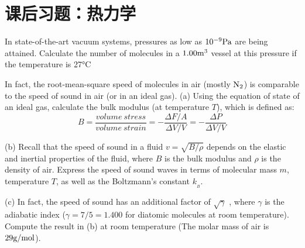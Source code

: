%
    \section{课后习题：热力学}
    \begin{example}
        In state-of-the-art vacuum systems, pressures as low as $10^{-9}\rm{Pa}$ are being attained. 
        Calculate the number of molecules in a $1.00\rm{m^{3}}$ vessel at this pressure if the temperature is 27°C
    \end{example}
    \begin{example}
        In fact, the root-mean-square 
        speed of molecules in air (mostly $\rm{N_2}$) is comparable to 
        the speed of sound in air (or in an ideal gas).
        (a) Using the equation of state of an ideal gas, calculate the bulk 
        modulus (at temperature $T$), which is defined as:
        \begin{equation*}
            B = \frac{volume \ stress}{volume \ strain} = -\frac{\Delta F/A}{\Delta V/V} = -\frac{\Delta P}{\Delta V/V}
        \end{equation*}

        (b) Recall that the speed of sound in a fluid $v=\sqrt{B/\rho}$ depends on
        the elastic and inertial properties of the fluid, where $B$ is the bulk
        modulus and $\rho$ is the density of air. Express the speed of sound 
        waves in terms of molecular mass $m$, temperature $T$, as well as 
        the Boltzmann's constant $k_{_B}$.

        (c) In fact, the speed of sound has an additional factor of $\sqrt{\gamma}$ ,
        where $\gamma$ is the adiabatic index ($\gamma = 7/5 = 1.400$ for diatomic molecules 
        at room temperature). Compute the result in (b) at room temperature (The molar
        mass of air is $29 \rm{g/mol}$). 
    \end{example}
